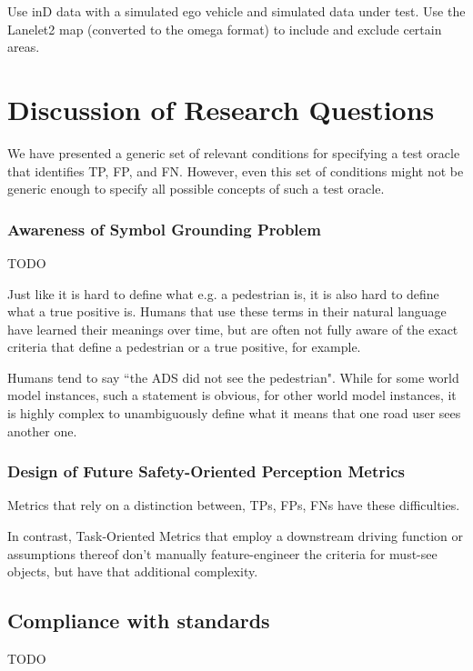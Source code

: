 \documentclass[conference]{IEEEtran}
\begin{document}
Use inD data with a simulated ego vehicle and simulated data under test.
Use the Lanelet2 map (converted to the omega format) to include and exclude certain areas.


\section{Discussion of Research Questions}
\label{sec:discussion}

We have presented a generic set of relevant conditions for specifying a test oracle that identifies TP, FP, and FN. 
However, even this set of conditions might not be generic enough to specify all possible concepts of such a test oracle. 


\subsubsection{Awareness of Symbol Grounding Problem}

TODO

Just like it is hard to define what e.g. a pedestrian is, it is also hard to define what a true positive is. 
Humans that use these terms in their natural language have learned their meanings over time, but are often not fully aware of the exact criteria that define a pedestrian or a true positive, for example.  

Humans tend to say ``the ADS did not see the pedestrian". While for some world model instances, such a statement is obvious, for other world model instances, it is highly complex to unambiguously define what it means that one road user sees another one. 


\subsubsection{Design of Future Safety-Oriented Perception Metrics}

Metrics that rely on a distinction between, TPs, FPs, FNs have these difficulties. 

In contrast, Task-Oriented Metrics that employ a downstream driving function or assumptions thereof don't manually feature-engineer the criteria for must-see objects, but have that additional complexity. 


\subsection{Compliance with standards}

TODO
\end{document}
